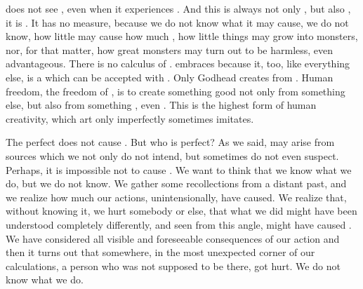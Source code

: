 {{\pa {} does not see , even when it experiences
.  And this  is always not only , but
also , it is .  It has no measure, because we
do not know what it may cause, we do not know, how little 
may cause how much , how little things may grow into
monsters, nor, for that matter, how great monsters may turn out to be
harmless, even advantageous.  There is no calculus of . 
 embraces  because it,
too, like everything else, is a  which can be accepted with
.  Only Godhead creates from .  Human
freedom, the freedom of , is to create something good not only from
something else, but also from something , even . 
This is the highest form of human creativity, which art only 
imperfectly sometimes imitates.

\pa
The perfect  does not cause . But who is perfect? 
As we said,  may arise from sources which we not only do not 
intend, but sometimes do not even suspect. Perhaps, it is impossible 
not to cause .  
We want to think that we know what we do, but we do not know.
We gather some recollections from a 
distant 
past, and we realize how much  our actions, unintensionally, 
have caused. We realize that, without knowing it, we hurt somebody or 
else, that what we did might have been understood completely 
differently, and seen from this angle, might have caused . 
We have considered all visible and foreseeable consequences of our 
action and then it turns out that somewhere, in the most unexpected 
corner of our calculations, a person who was not supposed to be 
there, got hurt. We do not know what we do. 

}}
